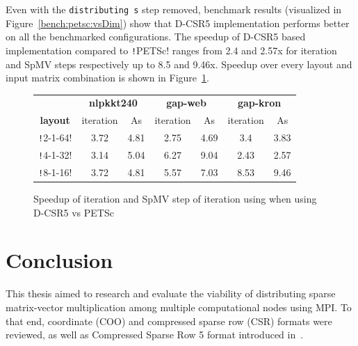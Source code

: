 \documentclass[thesis=M,english]{FITthesis}[2019/12/23]
\newcommand{\csre}[1]{\texttt!#1!}
\begin{document}
Even with the \texttt{distributing s} step removed, benchmark results (visualized in
Figure~\ref{bench:petsc:vsDim}) show that D-CSR5 implementation performs better
on all the benchmarked configurations. The speedup of D-CSR5 based implementation compared to \csre{PETSc}
ranges from 2.4 and 2.57x for iteration and SpMV steps respectively up to 8.5 and 9.46x. Speedup over every
layout and input matrix combination is shown in Figure~\ref{bench:petsc:table}.


\begin{figure}[htp]
    \centering
    \begin{tabular}{*{7}{c}}
        \toprule
                        & \multicolumn{2}{c}{\textbf{nlpkkt240}} & \multicolumn{2}{c}{\textbf{gap-web}} & \multicolumn{2}{c}{\textbf{gap-kron}}                           \\
        \cmidrule(lr){2-3} \cmidrule(lr){4-5} \cmidrule(lr){6-7}
        \textbf{layout} & iteration                              & As                                   & iteration                             & As   & iteration & As   \\
        \midrule
        \csre{2-1-64}   & 3.72                                   & 4.81                                 & 2.75                                  & 4.69 & 3.4       & 3.83 \\
        \csre{4-1-32}   & 3.14                                   & 5.04                                 & 6.27                                  & 9.04 & 2.43      & 2.57 \\
        \csre{8-1-16}   & 3.72                                   & 4.81                                 & 5.57                                  & 7.03 & 8.53      & 9.46 \\
        \bottomrule
    \end{tabular}
    \caption{Speedup of iteration and SpMV step of iteration using when using D-CSR5 vs PETSc}\label{bench:petsc:table}
\end{figure}


\chapter{Conclusion}

This thesis aimed to research and evaluate the viability of distributing sparse matrix-vector multiplication
among multiple computational nodes using MPI\@. To that end, coordinate (COO) and compressed sparse row (CSR) formats
were reviewed, as well as Compressed Sparse Row 5 format introduced in~\cite{liu2015csr5}.
\end{document}
